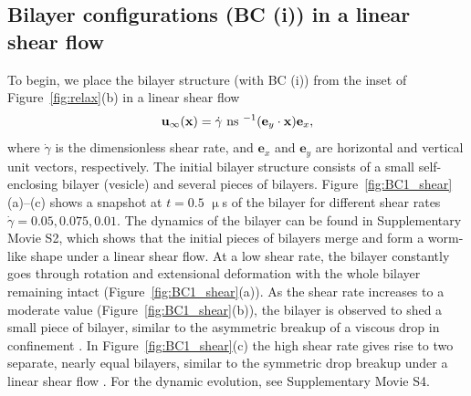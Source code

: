 \documentclass[prb,preprint,showpacs,preprintnumbers,amsmath,amssymb,longbibliography]{revtex4-1}
\newcommand{\ee}{\mathbf{e}}
\newcommand{\xx}{\mathbf{x}}
\newcommand{\uu}{\mathbf{u}}
\begin{document}
\subsection{Bilayer configurations (BC (i)) in a linear shear flow}
To begin, we place the bilayer structure (with BC (i)) from the inset of
Figure~\ref{fig:relax}(b) in a linear shear flow
\begin{equation}
\uu_\infty(\xx) = \dot\gamma \text{ ns }^{-1} ({\bf e}_y \cdot \mathbf{x}) {\bf e}_x,
\end{equation}
%
where $\dot\gamma$ is the dimensionless shear rate, and ${\ee}_x$ and
${\ee}_y$ are horizontal and vertical unit vectors, respectively. The
initial bilayer structure consists of a small self-enclosing bilayer
(vesicle) and several pieces of bilayers.
Figure~\ref{fig:BC1_shear}(a)--(c) shows a snapshot at $t = 0.5$
$\upmu$s of the bilayer for different shear rates $\dot\gamma=
0.05,0.075,0.01$. The dynamics of the bilayer can be found in
Supplementary Movie S2, which shows
that the initial pieces of bilayers
merge and form a worm-like shape under a linear shear flow. At a low
shear rate, the bilayer constantly goes through rotation and extensional
deformation with the whole bilayer remaining intact
(Figure~\ref{fig:BC1_shear}(a)). As the shear rate increases to a
moderate value (Figure~\ref{fig:BC1_shear}(b)), the bilayer is observed
to shed a small piece of bilayer, similar to the asymmetric breakup of a
viscous drop in confinement \cite{DuFuZhuMaLi2016_AICHEJ}.
In Figure~\ref{fig:BC1_shear}(c) the high shear rate gives rise to two
separate, nearly equal bilayers, similar to the symmetric drop breakup
under a linear shear flow \cite{Stone1994_ARFM}. For the dynamic evolution, see
Supplementary Movie S4.

\end{document}
